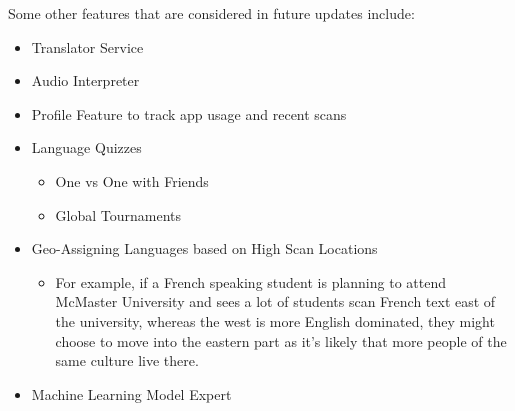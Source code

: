 Some other features that are considered in future updates include: 
\begin{itemize}
    \item Translator Service
    \item Audio Interpreter
    \item Profile Feature to track app usage and recent scans 
    \item Language Quizzes
    \begin{itemize}
        \item One vs One with Friends 
        \item Global Tournaments
    \end{itemize}
    \item Geo-Assigning Languages based on High Scan Locations 
    \begin{itemize}
        \item For example, if a French speaking student is planning to attend McMaster University and sees a lot of students scan French text east of the university, whereas the west is more English dominated, they might choose to move into the eastern part as it's likely that more people of the same culture live there. 
    \end{itemize}
    \item Machine Learning Model Expert
\end{itemize}

